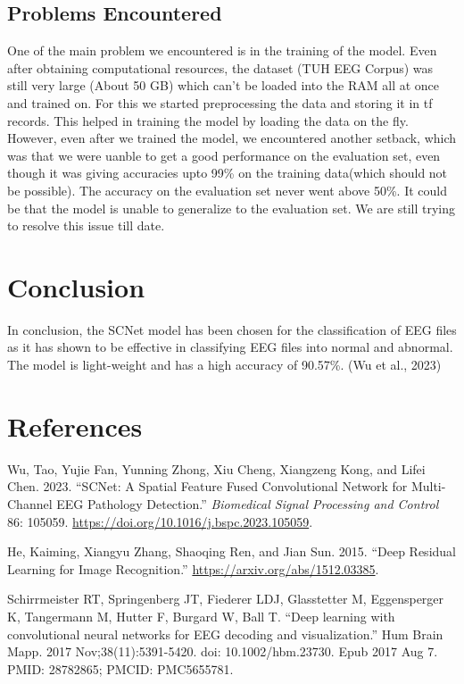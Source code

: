 \documentclass[10pt]{article}
\newlength{\cslhangindent}
\newlength{\cslentryspacingunit} %
\newenvironment{CSLReferences}[2] %
 {%
  \setlength{\parindent}{0pt}
  \ifodd #1
  \let\oldpar\par
  \def\par{\hangindent=\cslhangindent\oldpar}
  \fi
  \setlength{\parskip}{#2\cslentryspacingunit}
 }%
 {}
\begin{document}
\subsection{Problems Encountered}
One of the main problem we encountered is in the training of the model. Even after obtaining computational resources, the dataset (TUH EEG Corpus) was still very large (About 50 GB) which can't be loaded into the RAM all at once and trained on. For this we started preprocessing the data and storing it in tf records. This helped in training the model by loading the data on the fly.
However, even after we trained the model, we encountered another setback, which was that we were uanble to get a good performance on the evaluation set, even though it was giving accuracies upto 99\% on the training data(which should not be possible). The accuracy on the evaluation set never went above 50\%. It could be that the model is unable to generalize to the evaluation set. We are still trying to resolve this issue till date.


\section{Conclusion}
In conclusion, the SCNet model has been chosen for the classification of EEG files as it has shown to be effective in classifying EEG files into normal and abnormal. The model is light-weight and has a high accuracy of 90.57\%. (Wu et al., 2023)

\section{References}
\hypertarget{refs}{}
\begin{CSLReferences}{1}{0}
\leavevmode{}%
Wu, Tao, Yujie Fan, Yunning Zhong, Xiu Cheng, Xiangzeng Kong, and Lifei
Chen. 2023. {``SCNet: A Spatial Feature Fused Convolutional Network for
Multi-Channel EEG Pathology Detection.''} \emph{Biomedical Signal
Processing and Control} 86: 105059.
\url{https://doi.org/10.1016/j.bspc.2023.105059}.

\end{CSLReferences}

\vspace{0.5cm}
\hypertarget{refs}{}
\begin{CSLReferences}{1}{0}
\leavevmode{}%
He, Kaiming, Xiangyu Zhang, Shaoqing Ren, and Jian Sun. 2015. {``Deep
Residual Learning for Image Recognition.''}
\url{https://arxiv.org/abs/1512.03385}.

\end{CSLReferences}

\vspace{0.5cm}
\begin{CSLReferences}{1}{0}
\leavevmode{}%
Schirrmeister RT, Springenberg JT, Fiederer LDJ, Glasstetter M, Eggensperger K, Tangermann M, Hutter F, Burgard W, Ball T. {``Deep learning with convolutional neural networks for EEG decoding and visualization.''} Hum Brain Mapp. 2017 Nov;38(11):5391-5420. doi: 10.1002/hbm.23730. Epub 2017 Aug 7. PMID: 28782865; PMCID: PMC5655781.
\url{}
\end{CSLReferences}
\end{document}
